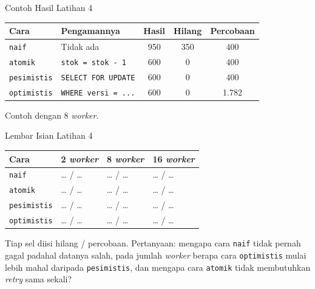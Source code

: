 \documentclass[aspectratio=169, table, 12pt]{beamer}
\begin{document}
\begin{frame}{{\Large Contoh Hasil Latihan 4}}
  \vspace{5pt}
  {\centering
  {\small
  \begin{tabularx}{\textwidth}{lXccc}
    \hline
    \textbf{Cara} & \textbf{Pengamannya} & \textbf{Hasil} & \textbf{Hilang} & \textbf{Percobaan} \\
    \hline
    \texttt{naif} & Tidak ada & 950 & 350 & 400 \\
    \hline
    \texttt{atomik} & \texttt{stok = stok - 1} & 600 & 0 & 400 \\
    \hline
    \texttt{pesimistis} & \texttt{SELECT FOR UPDATE} & 600 & 0 & 400 \\
    \hline
    \texttt{optimistis} & \texttt{WHERE versi = ...} & 600 & 0 & 1.782 \\
    \hline
  \end{tabularx}}\par}

  \vspace{8pt}
  {\footnotesize Contoh dengan 8 \textit{worker}.}
\end{frame}

\begin{frame}{{\Large Lembar Isian Latihan 4}}
  \vspace{5pt}
  {\centering
  {\small
  \begin{tabularx}{\textwidth}{lYYY}
    \hline
    \textbf{Cara} & \textbf{2 \textit{worker}} & \textbf{8 \textit{worker}} & \textbf{16 \textit{worker}} \\
    \hline
    \texttt{naif} & \dots{} / \dots & \dots{} / \dots & \dots{} / \dots \\
    \hline
    \texttt{atomik} & \dots{} / \dots & \dots{} / \dots & \dots{} / \dots \\
    \hline
    \texttt{pesimistis} & \dots{} / \dots & \dots{} / \dots & \dots{} / \dots \\
    \hline
    \texttt{optimistis} & \dots{} / \dots & \dots{} / \dots & \dots{} / \dots \\
    \hline
  \end{tabularx}}\par}

  \vspace{8pt}
  {\footnotesize Tiap sel diisi hilang / percobaan. Pertanyaan: mengapa cara
  \texttt{naif} tidak pernah gagal
  padahal datanya salah, pada jumlah \textit{worker} berapa cara \texttt{optimistis}
  mulai lebih mahal daripada \texttt{pesimistis}, dan mengapa cara
  \texttt{atomik} tidak membutuhkan \textit{retry} sama sekali?}
\end{frame}
\end{document}
